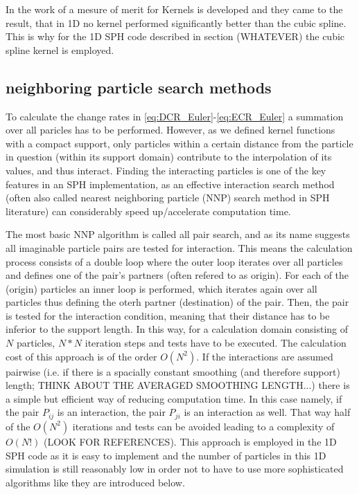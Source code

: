 \documentclass{report}
\begin{document}
In the work of \cite{Fulk1996} a mesure of merit for Kernels is developed and
they came to the result, that in 1D no kernel performed significantly better
than the cubic spline.
This is why for the 1D SPH code described in section (WHATEVER) the cubic
spline kernel is employed.

\subsection{neighboring particle search methods}
\label{sec:NNPS}
To calculate the change rates in \ref{eq:DCR_Euler}-\ref{eq:ECR_Euler} a
summation over all paricles has to be performed. However, as we defined kernel
functions with a compact support, only particles within a certain distance from
the particle in question (within its support domain) contribute to the
interpolation of its values, and thus interact. Finding the interacting
particles is one of the key features in an SPH implementation, as an effective
interaction search method (often also called nearest neighboring particle (NNP)
search method in SPH literature) can considerably speed up/accelerate
computation time. 

The most basic NNP algorithm is called all pair search, and as its name
suggests all imaginable particle pairs are tested for interaction. This means
the calculation process consists of a double loop where the outer loop
iterates over all particles and defines one of the pair's partners (often
refered to as origin). For each of the (origin) particles an inner loop is
performed, which iterates again over all particles thus defining the oterh
partner (destination) of the pair. Then, the pair is tested for the
interaction condition, meaning that their distance has to be inferior to the
support length. In this way, for a calculation domain consisting of $N$
particles, $N*N$ iteration steps and tests have to be executed. The
calculation cost of this approach is of the order $O(N^2)$. 
If the
interactions are assumed pairwise (i.e. if there is a spacially constant
smoothing (and therefore support) length; THINK ABOUT THE AVERAGED SMOOTHING
LENGTH...) there is a simple but efficient way of reducing computation
time. In this case namely, if the pair $P_{ij}$ is an interaction, the pair
$P_{ji}$ is an interaction as well. That way half of the $O(N^2)$ iterations
and tests can be avoided leading to a complexity of $O(N!)$ (LOOK FOR
REFERENCES). This approach is employed in the 1D SPH code as it is easy to
implement\cite{Liu2003} and the number of particles in this 1D simulation is
still reasonably low in order not to have to use more sophisticated algorithms
like they are introduced below.
\end{document}
